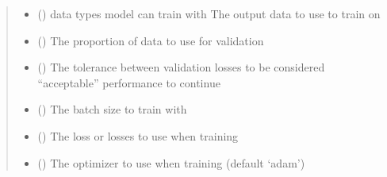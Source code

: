 \documentclass[letterpaper,10pt,english]{sphinxmanual}
\begin{document}
\begin{fulllineitems}
\begin{quote}
\begin{description}
\begin{itemize}
\item {} 
\sphinxAtStartPar
{} (\sphinxstyleliteralemphasis{\sphinxupquote{, }}) \textendash{} data types model can train with
The output data to use to train on

\item {} 
\sphinxAtStartPar
{} () \textendash{} The proportion of data to use for validation

\item {} 
\sphinxAtStartPar
{} () \textendash{} The tolerance between validation losses to be considered “acceptable”
performance to continue

\item {} 
\sphinxAtStartPar
{} () \textendash{} The batch size to train with

\item {} 
\sphinxAtStartPar
{} (\sphinxstyleliteralemphasis{\sphinxupquote{, }}) \textendash{} The loss or losses to use when training

\item {} 
\sphinxAtStartPar
{} (\sphinxstyleliteralemphasis{\sphinxupquote{, }}) \textendash{} The optimizer to use when training (default ‘adam’)


\end{itemize}
\end{description}
\end{quote}
\end{fulllineitems}
\end{document}
